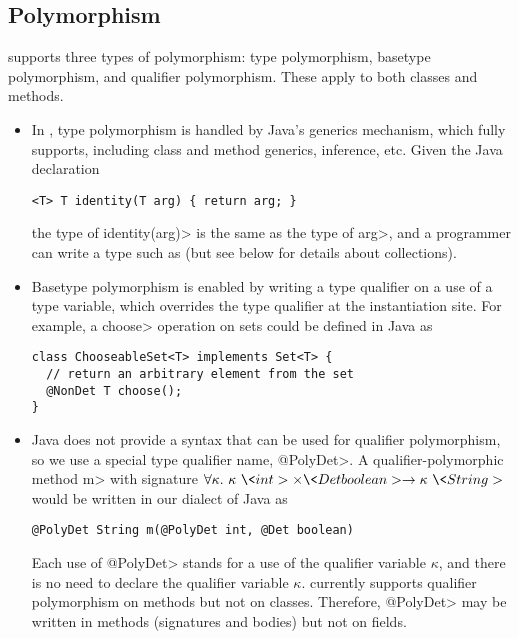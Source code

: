 \subsection{Polymorphism}\label{java-polymorphism}

\OurTypeSystem supports three types of polymorphism:  type
polymorphism, basetype polymorphism, and qualifier polymorphism.
These apply to both classes and methods.

\begin{itemize}
\item
In \theDeterminismCheckerImplementation,
type polymorphism is handled by Java's generics mechanism, which
\theDeterminismChecker fully supports, including class and method generics,
inference, etc.
Given the Java declaration
\begin{Verbatim}
<T> T identity(T arg) { return arg; }
\end{Verbatim}
the type of \<identity(arg)> is the same as the type of
\<arg>, and a programmer can write a type such as  (but see below for details about collections).
\item
Basetype polymorphism is enabled by writing a type qualifier on a use of a
type variable, which overrides the type qualifier at the instantiation
site.
For example, a \<choose> operation on sets could be defined in Java as
\begin{Verbatim}
class ChooseableSet<T> implements Set<T> {
  // return an arbitrary element from the set
  @NonDet T choose();
}
\end{Verbatim}
\item
Java does not provide a syntax that can be used for qualifier polymorphism,
so we use a special type qualifier name, \<@PolyDet>.
A qualifier-polymorphic method \<m> with signature $\forallt{\kappa} \kappa\ \<int> \times \<Det boolean> \rightarrow
\kappa\ \<String>$ would be written in our dialect of Java as
\begin{Verbatim}
@PolyDet String m(@PolyDet int, @Det boolean)
\end{Verbatim}
Each use of \<@PolyDet> stands for a use of the qualifier variable
$\kappa$, and there is no need to declare the qualifier variable $\kappa$.
\TheDeterminismChecker currently supports
qualifier
polymorphism on methods but not on classes.
Therefore, \<@PolyDet> may be written in methods (signatures and bodies)
but not on fields.
\end{itemize}




